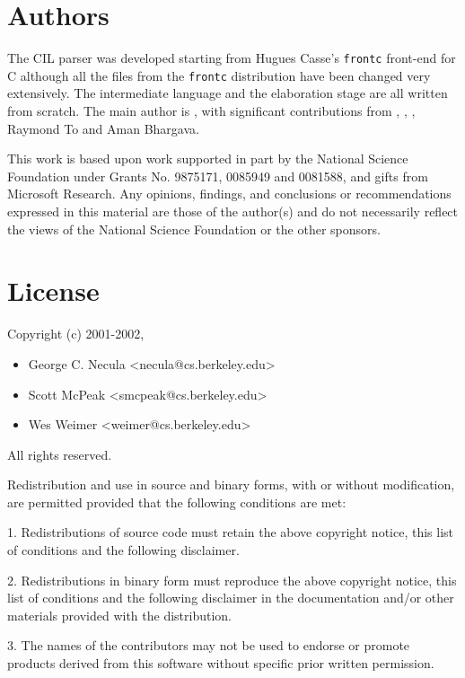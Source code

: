 \documentclass{article}
\def\t#1{{\tt #1}}
\begin{document}
\section{Authors}

 The CIL parser was developed starting from Hugues Casse's \t{frontc}
front-end for C although all the files from the \t{frontc} distribution have
been changed very extensively. The intermediate language and the elaboration
stage are all written from scratch. The main author is
, with significant
contributions from ,
,
, Raymond To and Aman
Bhargava.

 This work is based upon work supported in part by the National Science
Foundation under Grants No. 9875171, 0085949 and 0081588, and gifts from
Microsoft Research. Any opinions, findings, and conclusions or recommendations
expressed in this material are those of the author(s) and do not necessarily
reflect the views of the National Science Foundation or the other sponsors.

\section{License}

Copyright (c) 2001-2002, 
\begin{itemize}
\item George C. Necula    <necula@cs.berkeley.edu>
\item Scott McPeak        <smcpeak@cs.berkeley.edu>
\item Wes Weimer          <weimer@cs.berkeley.edu>
\end{itemize}
All rights reserved.

Redistribution and use in source and binary forms, with or without
modification, are permitted provided that the following conditions are met:

1. Redistributions of source code must retain the above copyright notice,
this list of conditions and the following disclaimer.

2. Redistributions in binary form must reproduce the above copyright notice,
this list of conditions and the following disclaimer in the documentation
and/or other materials provided with the distribution.

3. The names of the contributors may not be used to endorse or promote
products derived from this software without specific prior written
permission.
\end{document}
